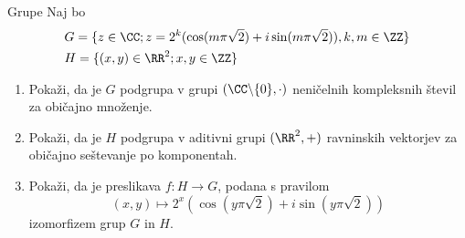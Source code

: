\begin{frame}{Grupe}
	Naj bo
	\begin{align*}	
	&G = \{  z \in \CC; z = 2^k (\cos(m\pi \sqrt{2}) + i \sin(m\pi\sqrt{2}) ),k,m \in \ZZ \}   \\
	&H = \{ (x,y) \in \RR^2;x,y \in \ZZ \} 
\end{align*}
	\begin{enumerate}
		\item
			Pokaži, da je $G$ podgrupa v grupi $(\CC \backslash \{0\}, \cdot) $
			neničelnih kompleksnih števil za običajno množenje.
		\item
			Pokaži, da je $H$ podgrupa v aditivni grupi $(\RR^2, +)$
			ravninskih vektorjev za običajno seštevanje po komponentah.
		\item
			Pokaži, da je preslikava $f:H\to G$, podana s pravilom
			$$(x,y) \mapsto 2^x(\cos(y\pi\sqrt{2})+ i \sin(y\pi\sqrt{2})) $$
			izomorfizem grup $G$ in $H$.
	\end{enumerate}
\end{frame}
